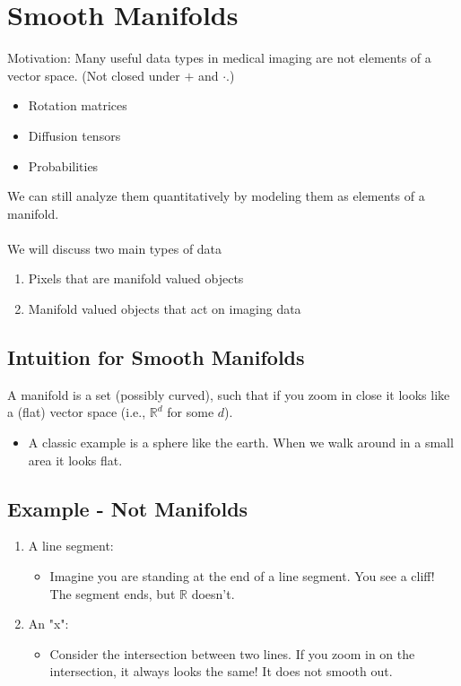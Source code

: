 \documentclass[10pt]{article}
\begin{document}
\section*{Smooth Manifolds}
Motivation: Many useful data types in medical imaging are not elements of a vector space.  (Not closed under $+$ and $\cdot$.)
\begin{itemize}
    \item Rotation matrices
    \item Diffusion tensors
    \item Probabilities
\end{itemize}
We can still analyze them quantitatively by modeling them as elements of a manifold.\\\\
We will discuss two main types of data
\begin{enumerate}
    \item Pixels that are manifold valued objects
    \item Manifold valued objects that act on imaging data
\end{enumerate}
\subsection*{Intuition for Smooth Manifolds}
A manifold is a set (possibly curved), such that if you zoom in close it looks like a (flat) vector space (i.e., $\mathbb{R}^d$ for some $d$).
\begin{itemize}
    \item A classic example is a sphere like the earth.  When we walk around in a small area it looks flat.
\end{itemize}

\subsection*{Example - Not Manifolds}
\begin{enumerate}
    \item A line segment:
    \begin{itemize}
        \item Imagine you are standing at the end of a line segment.  You see a cliff!  The segment ends, but $\mathbb{R}$ doesn't.
    \end{itemize}
    \item An "x":
    \begin{itemize}
        \item Consider the intersection between two lines.  If you zoom in on the intersection, it always looks the same!  It does not smooth out.
    \end{itemize}
\end{enumerate}
\end{document}
